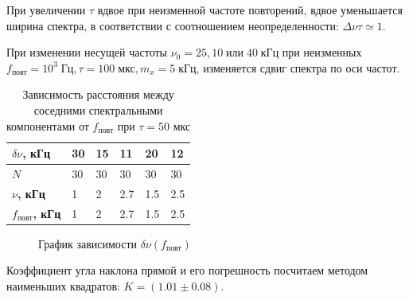 \documentclass[a4paper, 12pt]{article}
\begin{document}
При увеличении $\tau$ вдвое при неизменной частоте повторений, вдвое уменьшается ширина спектра, в соответствии с соотношением неопределенности: $\Delta \nu \tau \simeq 1$.

При изменении несущей частоты  $\nu_0 = 25, 10 \; \text{или} \; 40\; \text{кГц}$ при неизменных $f_\text{повт} = 10^3 \; \text{Гц}, \tau = 100 \; \text{мкс}, m_x = 5 \; \text{кГц}$, изменяется сдвиг спектра по оси частот.

\begin{table}[H]
\centering
\begin{tabular}{|l|l|l|l|l|l|}
\hline
\textbf{$\delta \nu$, кГц}    & 30 & 15 & 11  & 20  & 12  \\ \hline
\textbf{$N$}                  & 30 & 30 & 30  & 30  & 30  \\ \hline
\textbf{$\nu$, кГц}           & 1  & 2  & 2.7 & 1.5 & 2.5 \\ \hline
\textbf{$f_\text{повт}$, кГц} & 1  & 2  & 2.7 & 1.5 & 2.5 \\ \hline
\end{tabular}
\caption{Зависимость расстояния между соседними спектральными компонентами от $f_\text{повт}$ при $\tau = 50 \text{ мкс}$ }
\label{my-label}
\end{table}

\begin {figure}[H]
\begin{center}
{}
\caption{График зависимости $\delta \nu (f_\text{повт})$}
\end{center}
\end{figure}



Коэффициент угла наклона прямой и его погрешность посчитаем методом наименьших квадратов: $K = \left(1.01\pm0.08\right)$.
\end{document}
